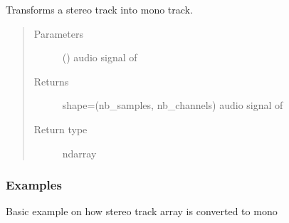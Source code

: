 \documentclass[letterpaper,10pt,english,openany,oneside]{sphinxmanual}
\begin{document}
\begin{fulllineitems}
\label{\detokenize{docs/source/preprocess:preprocess.utility.to_mono}}
Transforms a stereo track into mono track.
\begin{quote}\begin{description}
\item[{Parameters}] \leavevmode
{} (\sphinxstyleliteralemphasis{\sphinxupquote{, }}\sphinxstyleliteralemphasis{\sphinxupquote{ (}}\sphinxstyleliteralemphasis{\sphinxupquote{, }}\sphinxstyleliteralemphasis{\sphinxupquote{)}}) \textendash{} audio signal of 

\item[{Returns}] \leavevmode
shape=(nb\_samples, nb\_channels)
audio signal of 

\item[{Return type}] \leavevmode
ndarray

\end{description}\end{quote}
\subsubsection*{Examples}

Basic example on how stereo track array is converted to mono

\begin{sphinxVerbatim}[commandchars=\\\{\}]
  \PYG{p}{[}\PYG{p}{[} \PYG{p}{]}\PYG{p}{[} \PYG{p}{]} \PYG{p}{[} \PYG{p}{]} \PYG{p}{[} \PYG{p}{]} \PYG{p}{[} \PYG{p}{]}\PYG{p}{]}
\PYG{g+go}{[[4.5]}
\PYG{g+go}{ [4. ]]}
\end{sphinxVerbatim}

\end{fulllineitems}
\end{document}
